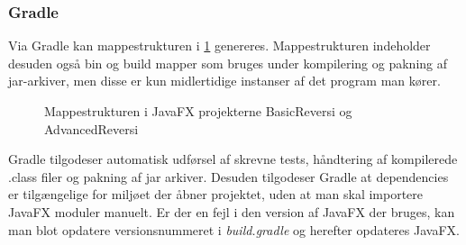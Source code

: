 \subsubsection{Gradle}
Via Gradle kan mappestrukturen i \cref{fig:tree} genereres. Mappestrukturen indeholder desuden også bin og build mapper som bruges under kompilering og pakning af jar-arkiver, men disse er kun midlertidige instanser af det program man kører.
\begin{figure}[H]
    \caption{Mappestrukturen i JavaFX projekterne BasicReversi og AdvancedReversi}\label{fig:tree}
\end{figure}

Gradle tilgodeser automatisk udførsel af skrevne tests, håndtering af kompilerede .class filer og pakning af jar arkiver. Desuden tilgodeser Gradle at dependencies er tilgængelige for miljøet der åbner projektet, uden at man skal importere JavaFX moduler manuelt. Er der en fejl i den version af JavaFX der bruges, kan man blot opdatere versionsnummeret i \emph{build.gradle} og herefter opdateres JavaFX.

